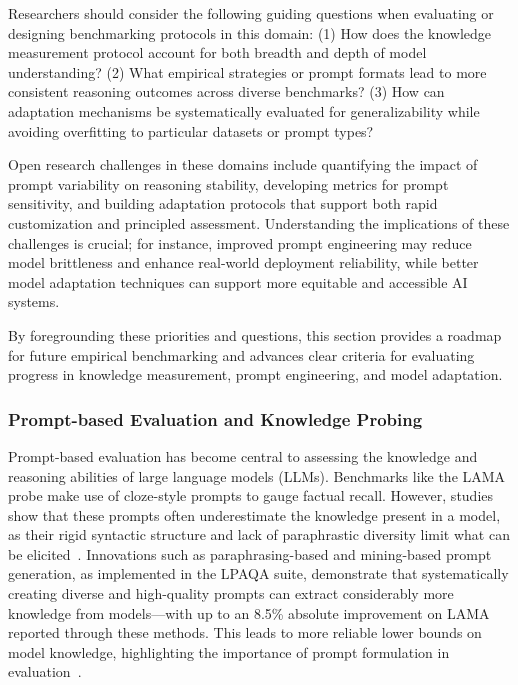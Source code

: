 \documentclass[sigconf]{acmart}
\begin{document}
Researchers should consider the following guiding questions when evaluating or designing benchmarking protocols in this domain: (1) How does the knowledge measurement protocol account for both breadth and depth of model understanding? (2) What empirical strategies or prompt formats lead to more consistent reasoning outcomes across diverse benchmarks? (3) How can adaptation mechanisms be systematically evaluated for generalizability while avoiding overfitting to particular datasets or prompt types?

Open research challenges in these domains include quantifying the impact of prompt variability on reasoning stability, developing metrics for prompt sensitivity, and building adaptation protocols that support both rapid customization and principled assessment. Understanding the implications of these challenges is crucial; for instance, improved prompt engineering may reduce model brittleness and enhance real-world deployment reliability, while better model adaptation techniques can support more equitable and accessible AI systems. 

By foregrounding these priorities and questions, this section provides a roadmap for future empirical benchmarking and advances clear criteria for evaluating progress in knowledge measurement, prompt engineering, and model adaptation.

\subsubsection{Prompt-based Evaluation and Knowledge Probing}

Prompt-based evaluation has become central to assessing the knowledge and reasoning abilities of large language models (LLMs). Benchmarks like the LAMA probe make use of cloze-style prompts to gauge factual recall. However, studies show that these prompts often underestimate the knowledge present in a model, as their rigid syntactic structure and lack of paraphrastic diversity limit what can be elicited~\cite{ref98}. Innovations such as paraphrasing-based and mining-based prompt generation, as implemented in the LPAQA suite, demonstrate that systematically creating diverse and high-quality prompts can extract considerably more knowledge from models---with up to an 8.5\% absolute improvement on LAMA reported through these methods. This leads to more reliable lower bounds on model knowledge, highlighting the importance of prompt formulation in evaluation~\cite{ref98}.
\end{document}
